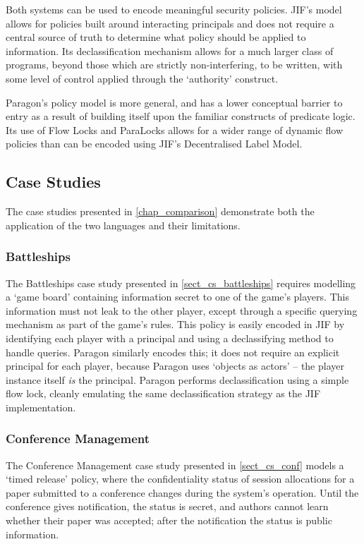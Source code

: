 Both systems can be used to encode meaningful security policies. JIF's model allows for policies built around interacting principals and does not require a central source of truth to determine what policy should be applied to information. Its declassification mechanism allows for a much larger class of programs, beyond those which are strictly non-interfering, to be written, with some level of control applied through the `authority' construct. 

Paragon's policy model is more general, and has a lower conceptual barrier to entry as a result of building itself upon the familiar constructs of predicate logic. Its use of Flow Locks and ParaLocks allows for a wider range of dynamic flow policies than can be encoded using JIF's Decentralised Label Model.

\subsection{Case Studies}

The case studies presented in \autoref{chap_comparison} demonstrate both the application of the two languages and their limitations.

\subsubsection{Battleships}

The Battleships case study presented in \ref{sect_cs_battleships} requires modelling a `game board' containing information secret to one of the game's players. This information must not leak to the other player, except through a specific querying mechanism as part of the game's rules. This policy is easily encoded in JIF by identifying each player with a principal and using a declassifying method to handle queries. Paragon similarly encodes this; it does not require an explicit principal for each player, because Paragon uses `objects as actors' -- the player instance itself \textit{is} the principal. Paragon performs declassification using a simple flow lock, cleanly emulating the same declassification strategy as the JIF implementation.

\subsubsection{Conference Management}

The Conference Management case study presented in \ref{sect_cs_conf} models a `timed release' policy, where the confidentiality status of session allocations for a paper submitted to a conference changes during the system's operation. Until the conference gives notification, the status is secret, and authors cannot learn whether their paper was accepted; after the notification the status is public information.

